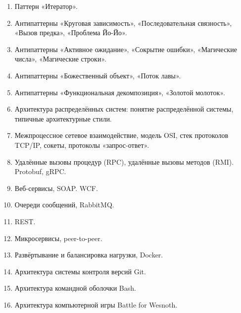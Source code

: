\documentclass[a5paper]{article}
\begin{document}
\begin{enumerate}
    \item Паттерн «Итератор».
    \item Антипаттерны «Круговая зависимость», «Последовательная связность», «Вызов предка», «Проблема Йо-Йо».
    \item Антипаттерны «Активное ожидание», «Сокрытие ошибки», «Магические числа», «Магические строки».
    \item Антипаттерны «Божественный объект», «Поток лавы».
    \item Антипаттерны «Функциональная декомпозиция», «Золотой молоток».
    \item Архитектура распределённых систем: понятие распределённой системы, типичные архитектурные стили.
    \item Межпроцессное сетевое взаимодействие, модель OSI, стек протоколов TCP/IP, сокеты, протоколы «запрос-ответ».
    \item Удалённые вызовы процедур (RPC), удалённые вызовы методов (RMI). Protobuf, gRPC.
    \item Веб-сервисы, SOAP. WCF.
    \item Очереди сообщений, RabbitMQ.
    \item REST.
    \item Микросервисы, peer-to-peer.
    \item Развёртывание и балансировка нагрузки, Docker.
    \item Архитектура системы контроля версий Git.
    \item Архитектура командной оболочки Bash.
    \item Архитектура компьютерной игры Battle for Wesnoth.
\end{enumerate}
\end{document}
